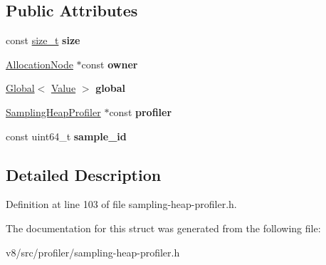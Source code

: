 \subsection*{Public Attributes}
\begin{DoxyCompactItemize}
\item 
\mbox{\label{structv8_1_1internal_1_1SamplingHeapProfiler_1_1Sample_ac396c0c916339057e38cc3b177a468ee}} 
const \mbox{\hyperlink{classsize__t}{size\+\_\+t}} {\bfseries size}
\item 
\mbox{\label{structv8_1_1internal_1_1SamplingHeapProfiler_1_1Sample_af801a2c3ed6c60d5cc883569364463d5}} 
\mbox{\hyperlink{classv8_1_1internal_1_1SamplingHeapProfiler_1_1AllocationNode}{Allocation\+Node}} $\ast$const {\bfseries owner}
\item 
\mbox{\label{structv8_1_1internal_1_1SamplingHeapProfiler_1_1Sample_a63b3ff855d4ea5536d4c4e9d25343579}} 
\mbox{\hyperlink{classv8_1_1Global}{Global}}$<$ \mbox{\hyperlink{classv8_1_1Value}{Value}} $>$ {\bfseries global}
\item 
\mbox{\label{structv8_1_1internal_1_1SamplingHeapProfiler_1_1Sample_affe3cb9f7754286cd509828831c7eaeb}} 
\mbox{\hyperlink{classv8_1_1internal_1_1SamplingHeapProfiler}{Sampling\+Heap\+Profiler}} $\ast$const {\bfseries profiler}
\item 
\mbox{\label{structv8_1_1internal_1_1SamplingHeapProfiler_1_1Sample_ae6f00a6bf2863b4cb803a77a34d162ea}} 
const uint64\+\_\+t {\bfseries sample\+\_\+id}
\end{DoxyCompactItemize}


\subsection{Detailed Description}


Definition at line 103 of file sampling-\/heap-\/profiler.\+h.



The documentation for this struct was generated from the following file\+:\begin{DoxyCompactItemize}
\item 
v8/src/profiler/sampling-\/heap-\/profiler.\+h\end{DoxyCompactItemize}
